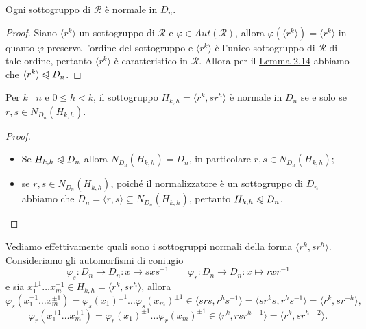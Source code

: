 \documentclass[11pt]{scrartcl}
\begin{document}
\begin{corollary}
    Ogni sottogruppo di $\mathcal{R}$ è normale in $D_n$.
\end{corollary}

\begin{proof}
    Siano $\langle r^k\rangle$ un sottogruppo di $\mathcal{R}$ e $\varphi
    \in Aut(\mathcal{R})$, allora $\varphi(\langle r^k\rangle) = \langle r^k\rangle$
    in quanto $\varphi$ preserva l'ordine del sottogruppo e $\langle r^k\rangle$
    è l'unico sottogruppo di $\mathcal{R}$ di tale ordine, pertanto $\langle r^k\rangle$
    è caratteristico in $\mathcal{R}$. Allora per il \hyperref[lemma1]{Lemma 2.14}
    abbiamo che $\langle r^k\rangle\trianglelefteqslant D_n$.
\end{proof}

\begin{corollary}
    Per $k\mid n$ e $0\leq h < k$, il sottogruppo $H_{k, h} = \langle r^k, sr^h\rangle$
    è normale in $D_n$ se e solo se $r, s \in N_{D_n}(H_{k, h})$.
\end{corollary}

\begin{proof}~
    \begin{itemize}
        \item Se $H_{k, h}\trianglelefteqslant D_n$ allora $N_{D_n}(H_{k, h}) = D_n$, 
        in particolare $r, s \in N_{D_n}(H_{k, h})$;
        \item se $r, s \in N_{D_n}(H_{k, h})$, poiché il normalizzatore è un
        sottogruppo di $D_n$ abbiamo che $D_n = \langle r, s\rangle \subseteq
        N_{D_n}(H_{k, h})$, pertanto $H_{k, h} \trianglelefteqslant D_n$.
    \end{itemize}
\end{proof}

Vediamo effettivamente quali sono i sottogruppi normali della forma 
$\langle r^k, sr^h\rangle$. Consideriamo gli automorfismi di coniugio \[
    \varphi_s: D_n \longrightarrow D_n :x \longmapsto sxs^{-1}\qquad
    \varphi_r: D_n \longrightarrow D_n :x \longmapsto rxr^{-1}
\]e sia $x_1^{\pm 1}\ldots x_m^{\pm 1} \in H_{k, h} = \langle r^k, sr^h\rangle$, allora
\[
    \varphi_s(x_1^{\pm 1}\ldots x_m^{\pm 1}) = \varphi_s(x_1)^{\pm 1}\ldots \varphi_s(x_m)^{\pm 1}
    \in \langle srs, r^hs^{-1}\rangle = \langle sr^ks, r^hs^{-1}\rangle = \langle
    r^k, sr^{-h}\rangle,
\]
\[
    \varphi_r(x_1^{\pm 1}\ldots x_m^{\pm 1}) = \varphi_r(x_1)^{\pm 1}\ldots \varphi_r(x_m)^{\pm 1}
    \in \langle r^k, rsr^{h - 1}\rangle = \langle r^k, sr^{h - 2}\rangle.
\]
\end{document}
